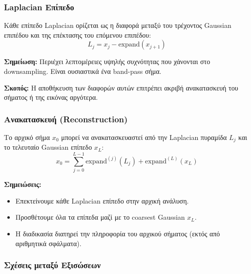 \documentclass[12pt]{article}
\begin{document}
\subsubsection{Laplacian Επίπεδο}

Κάθε επίπεδο Laplacian ορίζεται ως η διαφορά μεταξύ του τρέχοντος Gaussian επιπέδου και της επέκτασης του επόμενου επιπέδου:
\begin{equation}
L_j = x_j - \text{expand}(x_{j+1})
\label{eq:laplacian}
\end{equation}

\textbf{Σημείωση:} Περιέχει λεπτομέρειες υψηλής συχνότητας που χάνονται στο downsampling. Είναι ουσιαστικά ένα band-pass σήμα.

\textbf{Σκοπός:} Η αποθήκευση των διαφορών αυτών επιτρέπει ακριβή ανακατασκευή του σήματος ή της εικόνας αργότερα.

\subsubsection{Ανακατασκευή (Reconstruction)}

Το αρχικό σήμα $x_0$ μπορεί να ανακατασκευαστεί από την Laplacian πυραμίδα $L_j$ και το τελευταίο Gaussian επίπεδο $x_L$:
\begin{equation}
x_0 = \sum_{j=0}^{L-1} \text{expand}^{(j)}(L_j) + \text{expand}^{(L)}(x_L)
\label{eq:reconstruction}
\end{equation}

\textbf{Σημειώσεις:}
\begin{itemize}
    \item Επεκτείνουμε κάθε Laplacian επίπεδο στην αρχική ανάλυση.
    \item Προσθέτουμε όλα τα επίπεδα μαζί με το coarsest Gaussian $x_L$.
    \item Η διαδικασία διατηρεί την πληροφορία του αρχικού σήματος (εκτός από αριθμητικά σφάλματα).
\end{itemize}

\subsubsection{Σχέσεις μεταξύ Εξισώσεων}
\end{document}
